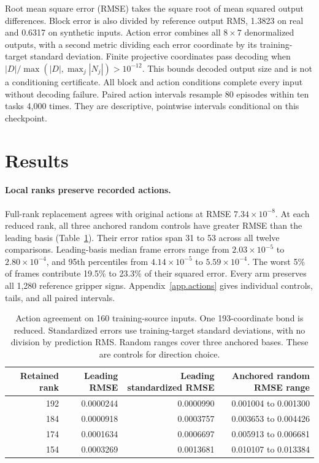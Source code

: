 \documentclass{article}
\begin{document}
Root mean square error (RMSE) takes the square root of mean squared output differences. Block error is also divided by reference output RMS, 1.3823 on real and 0.6317 on synthetic inputs. Action error combines all $8\times7$ denormalized outputs, with a second metric dividing each error coordinate by its training-target standard deviation. Finite projective coordinates pass decoding when $|D|/\max(|D|,\max_j|N_j|)>10^{-12}$. This bounds decoded output size and is not a conditioning certificate. All block and action conditions complete every input without decoding failure. Paired action intervals resample 80 episodes within ten tasks 4,000 times. They are descriptive, pointwise intervals conditional on this checkpoint.

\section{Results}
\label{sec.results}

\paragraph{Local ranks preserve recorded actions.}
Full-rank replacement agrees with original actions at RMSE $7.34\times10^{-8}$. At each reduced rank, all three anchored random controls have greater RMSE than the leading basis (Table~\ref{tab.actions}). Their error ratios span 31 to 53 across all twelve comparisons. Leading-basis median frame errors range from $2.03\times10^{-5}$ to $2.80\times10^{-4}$, and 95th percentiles from $4.14\times10^{-5}$ to $5.59\times10^{-4}$. The worst 5\% of frames contribute 19.5\% to 23.3\% of their squared error. Every arm preserves all 1,280 reference gripper signs. Appendix~\ref{app.actions} gives individual controls, tails, and all paired intervals.

\begin{table}[ht]
\centering\small\setlength{\tabcolsep}{5pt}
\begin{tabular}{@{}rrrr@{}}
\toprule
Retained rank & Leading RMSE & Leading standardized RMSE & Anchored random RMSE range\\
\midrule
192 & 0.0000244 & 0.0000990 & 0.001004 to 0.001300\\
184 & 0.0000918 & 0.0003757 & 0.003653 to 0.004426\\
174 & 0.0001634 & 0.0006697 & 0.005913 to 0.006681\\
154 & 0.0003269 & 0.0013681 & 0.010107 to 0.013384\\
\bottomrule
\end{tabular}
\caption{Action agreement on 160 training-source inputs. One 193-coordinate bond is reduced. Standardized errors use training-target standard deviations, with no division by prediction RMS. Random ranges cover three anchored bases. These are controls for direction choice.}
\label{tab.actions}
\end{table}
\end{document}
